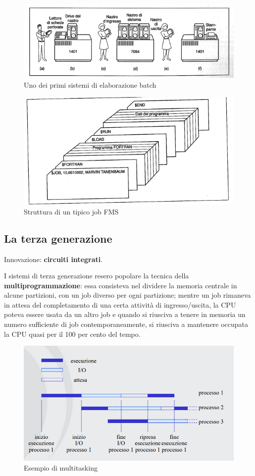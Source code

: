 \begin{figure}[H]
    \centering
    \includegraphics[width=0.7\linewidth]{assets/batch1.png}
    \caption{Uno dei primi sistemi di elaborazione batch}
\end{figure}

\begin{figure}[H]
    \centering
    \includegraphics[width=0.7\linewidth]{assets/job1.png}
    \caption{Struttura di un tipico job FMS}
\end{figure}

\subsection{La terza generazione}
Innovazione: \textbf{circuiti integrati}.

I sistemi di terza generazione resero popolare la tecnica della \textbf{multiprogrammazione}: essa consisteva nel dividere la memoria centrale in alcune partizioni, con un job diverso per ogni partizione; mentre un job rimaneva in attesa del completamento di una certa attività di ingresso/uscita, la CPU poteva essere usata da un altro job e quando si riusciva a tenere in memoria un numero sufficiente di job contemporaneamente, si riusciva a mantenere occupata la CPU quasi per il 100 per cento del tempo.

\begin{figure}[h!]
    \centering
    \includegraphics[width=0.7\linewidth]{assets/multiprogrammazione1.png}
    \caption{Esempio di multitasking}
\end{figure}

